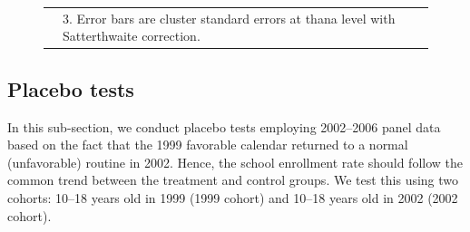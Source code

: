 \documentclass[12pt,letterpaper]{article}
\newcommand{\0}{\ensuremath{\mbox{\boldmath $0$}}}
\begin{document}
\begin{figure}
\begin{tabular}{>{\hfill\scriptsize}p{1cm}<{}>{\scriptsize}p{11cm}<{\hfill}}
& 3. Error bars are cluster standard errors at thana level with Satterthwaite correction.
\end{tabular}
\end{figure}

\subsection{Placebo tests}

In this sub-section, we conduct placebo tests employing 2002–2006 panel data based on the fact that the 1999 favorable calendar returned to a normal (unfavorable) routine in 2002. Hence, the school enrollment rate should follow the common trend between the treatment and control groups. We test this using two cohorts: 10–18 years old in 1999 (1999 cohort) and 10–18 years old in 2002 (2002 cohort).

\end{document}
